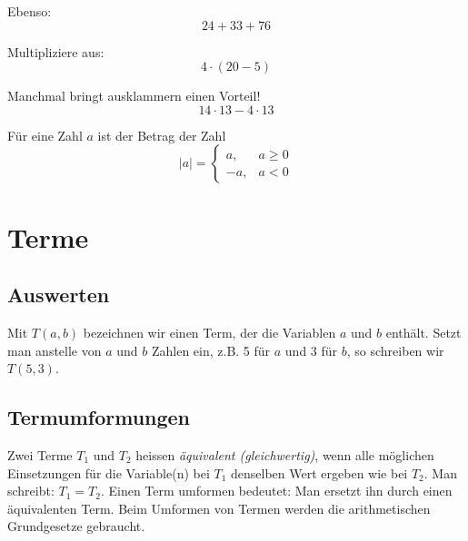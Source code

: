 \begin{example}
Ebenso:
\[
	24+33+76
\]
\end{example}

\begin{example}
Multipliziere aus:
\[
	4\cdot (20-5)
\]
\end{example}

\begin{example}
Manchmal bringt ausklammern einen Vorteil!
\[
	14\cdot 13 - 4\cdot 13
\]
\end{example}

\begin{tcolorbox}[colback=green!10!white,colframe=green!70!black,title=Betrag einer Zahl,width=.9\linewidth]
		Für eine Zahl $a$ ist der Betrag der Zahl
		\[
			|a|=\left\{\begin{array}{ll} a, & a\ge 0 \\
         -a, & a<0\end{array}\right.
		\]
\end{tcolorbox}


\section{Terme}
\subsection*{Auswerten}
Mit $T(a,b)$ bezeichnen wir einen Term, der die Variablen $a$ und $b$ enthält. Setzt man anstelle von $a$ und $b$ Zahlen ein, z.B. 5 für $a$ und 3 für $b$, so schreiben wir $T(5,3)$.
\vspace{1cm}

\subsection*{Termumformungen}
Zwei Terme $T_1$ und $T_2$ heissen \emph{äquivalent (gleichwertig)}, wenn alle möglichen Einsetzungen für die Variable(n) bei $T_1$ denselben Wert ergeben wie bei $T_2$. Man schreibt: $T_1 = T_2$.
\vspace{5mm}
Einen Term umformen bedeutet: Man ersetzt ihn durch einen äquivalenten Term. Beim Umformen von Termen werden die arithmetischen Grundgesetze gebraucht.

